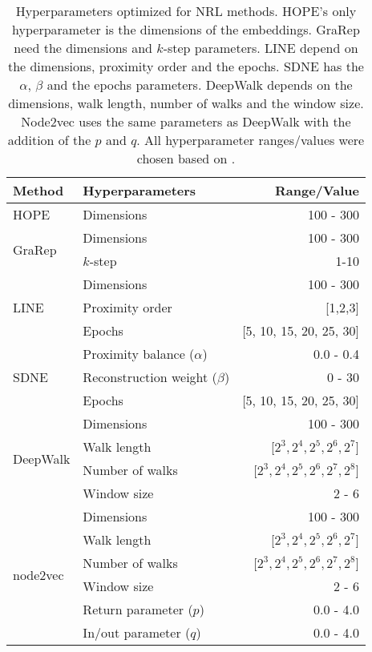 \begin{table}[h!]
    \centering
    \begin{tabular}{ |l|l|r| } 
        \hline
        \textbf{Method} & \textbf{Hyperparameters} & \textbf{Range/Value} \\
        \hline
        HOPE & Dimensions & 100 - 300 \\
        \hline
        \multirow{2}{5em}{GraRep} & Dimensions & 100 - 300 \\ 
            & $k$-step & 1-10 \\ 
        \hline
        \multirow{3}{4em}{LINE} & Dimensions & 100 - 300 \\ 
            & Proximity order & [1,2,3] \\
            & Epochs & [5, 10, 15, 20, 25, 30] \\
        \hline
        \multirow{3}{5em}{SDNE} & Proximity balance ($\alpha$) & 0.0 - 0.4 \\ 
            & Reconstruction weight ($\beta$) & 0 - 30 \\
            & Epochs & [5, 10, 15, 20, 25, 30] \\
        \hline
        \multirow{4}{5em}{DeepWalk} & Dimensions & 100 - 300 \\ 
            & Walk length & [$2^3, 2^4, 2^5, 2^6, 2^7$] \\
            & Number of walks & [$2^3, 2^4, 2^5, 2^6, 2^7, 2^8$] \\
            & Window size & 2 - 6 \\
        \hline
        \multirow{6}{5em}{node2vec} & Dimensions & 100 - 300 \\ 
            & Walk length & [$2^3, 2^4, 2^5, 2^6, 2^7$] \\
            & Number of walks & [$2^3, 2^4, 2^5, 2^6, 2^7, 2^8$] \\
            & Window size & 2 - 6 \\
            & Return parameter ($p$) & 0.0 - 4.0 \\
            & In/out parameter ($q$) & 0.0 - 4.0 \\
        \hline
    \end{tabular}
    \caption[Hyperparameters optimized for NRL methods]{Hyperparameters optimized for NRL methods. HOPE's only hyperparameter is the dimensions of the embeddings. GraRep need the dimensions and $k$-step parameters. LINE depend on the dimensions, proximity order and the epochs. SDNE has the $\alpha$, $\beta$ and the epochs parameters. DeepWalk depends on the dimensions, walk length, number of walks and the window size. Node2vec uses the same parameters as DeepWalk with the addition of the $p$ and $q$. All hyperparameter ranges/values were chosen based on \cite{yue_graph_2019}.} 
    \label{tab:hyperparameters}
\end{table}

